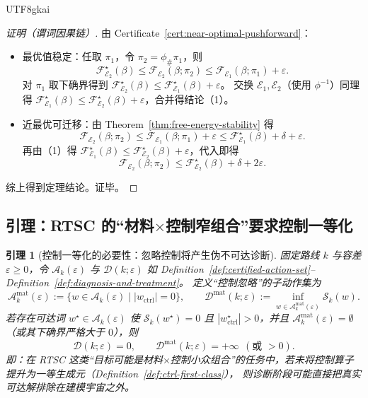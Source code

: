 \documentclass[12pt]{article}
\newtheorem{lemma}{引理}[section]
\newcommand{\RTSC}{\textsf{RTSC}}
\begin{document}
\begin{CJK*}{UTF8}{gkai}
\begin{proof}[证明（谓词因果链）]
由 Certificate~\ref{cert:near-optimal-pushforward}：
\begin{itemize}
  \item 最优值稳定：任取 $\pi_1$，令 $\pi_2=\phi_{\#}\pi_1$，则
  \[
  \mathcal{F}_{\mathcal{E}_2}^\star(\beta)\le \mathcal{F}_{\mathcal{E}_2}(\beta;\pi_2)\le \mathcal{F}_{\mathcal{E}_1}
    (\beta;\pi_1)+\varepsilon.
  \]
  对 $\pi_1$ 取下确界得到 $\mathcal{F}_{\mathcal{E}_2}^\star(\beta)\le \mathcal{F}_{\mathcal{E}_1}^\star(\beta)+\varepsilon$。
  交换 $\mathcal{E}_1,\mathcal{E}_2$（使用 $\phi^{-1}$）同理得 $\mathcal{F}_{\mathcal{E}_1}^\star(\beta)\le \mathcal{F}
    _{\mathcal{E}_2}^\star(\beta)+\varepsilon$，合并得结论（1）。
  \item 近最优可迁移：由 Theorem~\ref{thm:free-energy-stability} 得
  \[
  \mathcal{F}_{\mathcal{E}_2}(\beta;\pi_2)\le \mathcal{F}_{\mathcal{E}_1}(\beta;\pi_1)+\varepsilon
  \le \mathcal{F}_{\mathcal{E}_1}^\star(\beta)+\delta+\varepsilon.
  \]
  再由（1）得 $\mathcal{F}_{\mathcal{E}_1}^\star(\beta)\le \mathcal{F}_{\mathcal{E}_2}^\star(\beta)+\varepsilon$，代入即得
  \[
  \mathcal{F}_{\mathcal{E}_2}(\beta;\pi_2)\le \mathcal{F}_{\mathcal{E}_2}^\star(\beta)+\delta+2\varepsilon.
  \]
\end{itemize}
综上得到定理结论。证毕。
\end{proof}

\subsection{引理：\RTSC{} 的“材料$\times$控制窄组合”要求控制一等化}

\begin{lemma}[控制一等化的必要性：忽略控制将产生伪不可达诊断]
\label{lem:ctrl-first-class-necessary}
固定路线 $k$ 与容差 $\varepsilon\ge 0$，令 $\mathcal{A}_k(\varepsilon)$ 与 $\mathcal{D}(k;\varepsilon)$ 如 Definition~\ref{def:certified-action-set}--Definition~\ref{def:diagnosis-and-treatment}。
定义“控制忽略”的子动作集为
\[
\mathcal{A}_k^{\mathrm{mat}}(\varepsilon)
:=
\{w\in \mathcal{A}_k(\varepsilon)\mid |w_{\mathrm{ctrl}}|=0\},
\qquad
\mathcal{D}^{\mathrm{mat}}(k;\varepsilon):=\inf_{w\in \mathcal{A}_k^{\mathrm{mat}}(\varepsilon)} \mathcal{S}_k(w).
\]
若存在可达词 $w^\star\in\mathcal{A}_k(\varepsilon)$ 使 $\mathcal{S}_k(w^\star)=0$ 且 $|w^\star_{\mathrm{ctrl}}|>0$，并且
  $\mathcal{A}_k^{\mathrm{mat}}(\varepsilon)=\emptyset$（或其下确界严格大于 $0$），则
\[
\mathcal{D}(k;\varepsilon)=0,\qquad \mathcal{D}^{\mathrm{mat}}(k;\varepsilon)=+\infty\ \ (\text{或 } >0).
\]
即：在 \RTSC{} 这类“目标可能是材料$\times$控制小众组合”的任务中，若未将控制算子提升为一等生成元（Definition~\ref{def:ctrl-first-class}），
  则诊断阶段可能直接把真实可达解排除在建模宇宙之外。
\end{lemma}


\end{CJK*}
\end{document}
